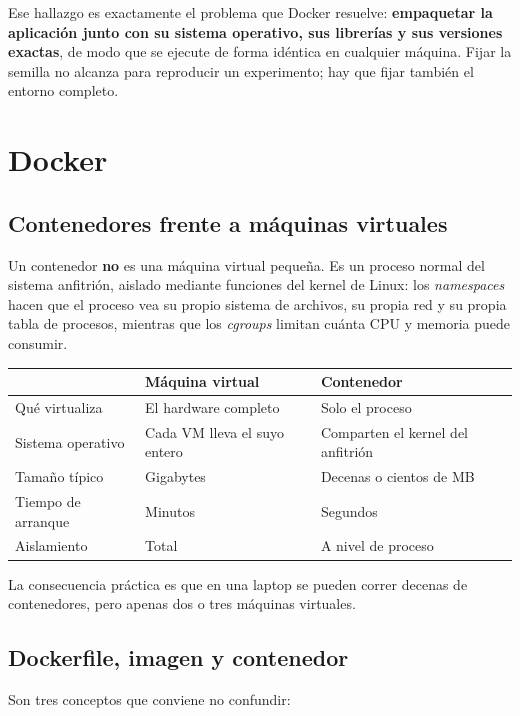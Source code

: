 \documentclass[12pt,a4paper]{article}
\begin{document}
Ese hallazgo es exactamente el problema que Docker resuelve: \textbf{empaquetar la aplicaci\'on
junto con su sistema operativo, sus librer\'ias y sus versiones exactas}, de modo que se ejecute
de forma id\'entica en cualquier m\'aquina. Fijar la semilla no alcanza para reproducir un
experimento; hay que fijar tambi\'en el entorno completo.

\section{Docker}

\subsection{Contenedores frente a m\'aquinas virtuales}

Un contenedor \textbf{no} es una m\'aquina virtual peque\~na. Es un proceso normal del sistema
anfitri\'on, aislado mediante funciones del kernel de Linux: los \emph{namespaces} hacen que el
proceso vea su propio sistema de archivos, su propia red y su propia tabla de procesos, mientras
que los \emph{cgroups} limitan cu\'anta CPU y memoria puede consumir.

\begin{center}
\begin{tabular}{|l|l|l|}
\hline
& \textbf{M\'aquina virtual} & \textbf{Contenedor} \\
\hline
Qu\'e virtualiza & El hardware completo & Solo el proceso \\
Sistema operativo & Cada VM lleva el suyo entero & Comparten el kernel del anfitri\'on \\
Tama\~no t\'ipico & Gigabytes & Decenas o cientos de MB \\
Tiempo de arranque & Minutos & Segundos \\
Aislamiento & Total & A nivel de proceso \\
\hline
\end{tabular}
\end{center}

La consecuencia pr\'actica es que en una laptop se pueden correr decenas de contenedores, pero
apenas dos o tres m\'aquinas virtuales.

\subsection{Dockerfile, imagen y contenedor}

Son tres conceptos que conviene no confundir:
\end{document}
